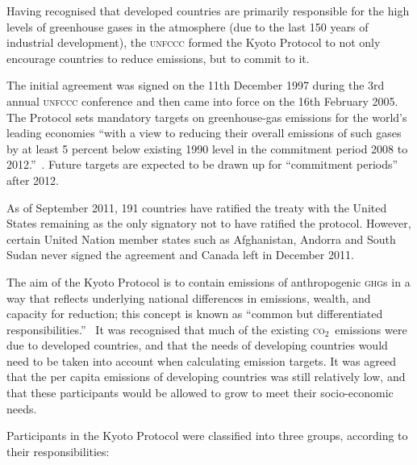 \documentclass[]{article} %
\newcommand{\CO}{\textsc{co}$_2$~}
\begin{document}
Having recognised that developed countries are primarily responsible for the high levels of greenhouse gases in the atmosphere (due to the last 150 years of industrial development), the \textsc{unfccc} formed the Kyoto Protocol to not only encourage countries to reduce emissions, but to commit to it.~\cite{UNFCCC-kyoto-summary}

The initial agreement was signed on the 11th December 1997 during the 3rd annual \textsc{unfccc} conference and then came into force on the 16th February 2005. The Protocol sets mandatory targets on greenhouse-gas emissions for the world’s leading economies ``with a view to reducing their overall emissions of such gases by at least 5 percent below existing 1990 level in the commitment period 2008 to 2012.''~\cite{UNFCCC-98-p1}. Future targets are expected to be drawn up for ``commitment periods'' after 2012.~\cite{UNFCCC-98-p4}

As of September 2011, 191 countries have ratified the treaty with the United States remaining as the only signatory not to have ratified the protocol. However, certain United Nation member states such as Afghanistan, Andorra and South Sudan never signed the agreement and Canada left in December 2011.

The aim of the Kyoto Protocol is to contain emissions of anthropogenic \textsc{ghg}s in a way that reflects underlying national differences in emissions, wealth, and capacity for reduction; this concept is known as “common but differentiated responsibilities.”~\cite{Grubb-04}\cite{UNFCCC-92} It was recognised that much of the existing \CO emissions were due to developed countries, and that the needs of developing countries would need to be taken into account when calculating emission targets. It was agreed that the per capita emissions of developing countries was still relatively low, and that these participants would be allowed to grow to meet their socio-economic needs.

Participants in the Kyoto Protocol were classified into three groups, according to their responsibilities:~\cite{UNFCCC-92}
\end{document}
